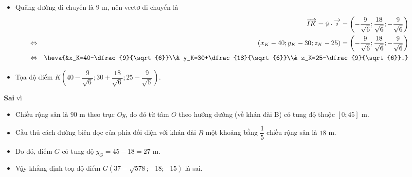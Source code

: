 \begin{ex}
{\begin{itemchoice}
\begin{itemize}
$$		   $$
		   \item Quãng đường di chuyển là $9$ m, nên vectơ di chuyển là
		   \begin{eqnarray*}
			   &&\overrightarrow{IK} = 9 \cdot\overrightarrow{i} = \left( -\dfrac{9}{\sqrt{6}} ; \dfrac{18}{\sqrt{6}} ; -\dfrac{9}{\sqrt{6}} \right)\\
			   &\Leftrightarrow& \left(x_K-40;y_K-30;z_K-25\right)=\left( -\dfrac{9}{\sqrt{6}} ; \dfrac{18}{\sqrt{6}} ; -\dfrac{9}{\sqrt{6}} \right)\\
			   &\Leftrightarrow&\heva{&x_K=40-\dfrac{9}{\sqrt{6}}\\& y_K=30+\dfrac{18}{\sqrt{6}}\\& z_K=25-\dfrac{9}{\sqrt{6}}.}
		   \end{eqnarray*}
		   \item Tọa độ điểm $K\left(40-\dfrac{9}{\sqrt{6}};30+\dfrac{18}{\sqrt{6}};25-\dfrac{9}{\sqrt{6}}\right)$.
	   \end{itemize}
	   \itemch \textbf{Sai} vì\\
	   \begin{itemize}
		\item Chiều rộng sân là $90$ m theo trục $Oy$, do đó từ tâm $O$ theo hướng dướng (về khán đài B) có tung độ thuộc $\left[0;45\right]$ m.
		\item Cầu thủ cách đường biên dọc của phía đối diện với khán đài $B$ một khoảng bằng $\dfrac{1}{5}$ chiều rộng sân là $18$ m.
		\item Do đó, điểm $G$ có tung độ $y_G=45-18=27$ m.
		\item Vậy khẳng định toạ độ điểm $G\left(37-\sqrt{578};-18;-15\right)$ là sai.
	   \end{itemize}
	\end{itemchoice}
}
\end{ex}

